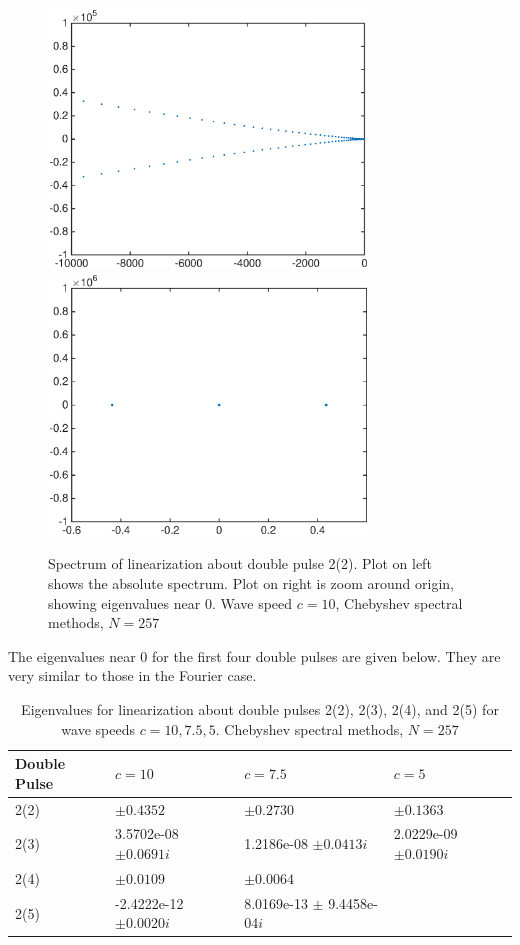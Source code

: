 \documentclass[12pt]{article}
\begin{document}
\begin{figure}[H]
	\includegraphics[width=8.5cm]{cheb10ud2_2}
	\includegraphics[width=8.5cm]{cheb10ud2_2zoom}
	\caption{Spectrum of linearization about double pulse 2(2). Plot on left shows the absolute spectrum. Plot on right is zoom around origin, showing eigenvalues near 0. Wave speed $c = 10$, Chebyshev spectral methods, $N = 257$}
\end{figure}

The eigenvalues near 0 for the first four double pulses are given below. They are very similar to those in the Fourier case.

\begin{table}[H]
\begin{tabular}{l|lll}
 Double Pulse   & $c = 10$            & $c=7.5$                        & $c=5$        \\ \hline
  2(2) &     $\pm 0.4352$             & $\pm 0.2730$                   & $\pm 0.1363$ \\ 
  2(3) &     3.5702e-08 $\pm 0.0691i$ & 1.2186e-08 $\pm 0.0413i$       & 2.0229e-09 $\pm 0.0190i$\\ 
  2(4) &     $\pm 0.0109$             & $\pm 0.0064$                   & \\ 
  2(5) &    -2.4222e-12 $\pm 0.0020i$ & 8.0169e-13 $\pm$ 9.4458e-04$i$ & \\
\end{tabular}
\caption{Eigenvalues for linearization about double pulses 2(2), 2(3), 2(4), and 2(5) for wave speeds $c = 10, 7.5, 5$. Chebyshev spectral methods, $N = 257$}
\end{table}
\end{document}
